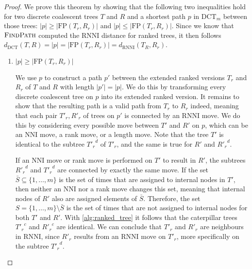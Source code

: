 \documentclass[11pt]{amsart}
\newcommand{\rnni}{\mathrm{RNNI}}
\newcommand{\findpath}{\textsc{FindPath}}
\newcommand{\nni}{\mathrm{NNI}}
\newcommand{\fp}{\mathrm{FP}}
\newcommand{\dct}{\mathrm{DCT}}
\begin{document}
\begin{proof}
	We prove this theorem by showing that the following two inequalities hold for two discrete coalescent trees $T$ and $R$ and a shortest path $p$ in $\dct_m$ between those trees: $|p| \geq |\fp(T_r,R_r)|$ and $|p| \leq |\fp(T_r,R_r)|$.
	Since we know that $\findpath$ computed the $\rnni$ distance for ranked trees, it then follows $d_{\dct}(T,R) = |p| = |\fp(T_r,R_r)| = d_{\rnni}(T_R,R_r)$.

	\begin{enumerate}
		\item $|p| \geq |\fp(T_r,R_r)|$

		We use $p$ to construct a path $p'$ between the extended ranked versions $T_r$ and $R_r$ of $T$ and $R$ with length $|p'| = |p|$.
		We do this by transforming every discrete coalescent tree on $p$ into its extended ranked version.
		It remains to show that the resulting path is a valid path from $T_r$ to $R_r$ indeed, meaning that each pair $T'_r, R'_r$ of trees on $p'$ is connected by an $\rnni$ move.
		We do this by considering every possible move between $T'$ and $R'$ on $p$, which can be an $\nni$ move, a rank move, or a length move.
		Note that the tree $T'$ is identical to the subtree ${T'_r}^d$ of $T'_r$, and the same is true for $R'$ and ${R'_r}^d$.
		
		If an $\nni$ move or rank move is performed on $T'$ to result in $R'$, the subtrees ${R'_r}^d$ and ${T'_r}^d$ are connected by exactly the same move.
		If the set $\bar{S} \subseteq \{1, \ldots, m\}$ is the set of times that are assigned to internal nodes in $T'$, then neither an $\nni$ nor a rank move changes this set, meaning that internal nodes of $R'$ also are assigned elements of $\bar S$.
		Therefore, the set $S = \{1, \ldots, m\} \setminus \bar S$ is the set of times that are not assigned to internal nodes for both $T'$ and $R'$.
		With \autoref{alg:ranked_tree} it follows that the caterpillar trees ${T'_r}^c$ and ${R'_r}^c$ are identical.
		We can conclude that $T'_r$ and $R'_r$ are neighbours in $\rnni$, since $R'_r$ results from an $\rnni$ move on $T'_r$, more specifically on the subtree ${T'_r}^d$.


\end{enumerate}
\end{proof}
\end{document}
